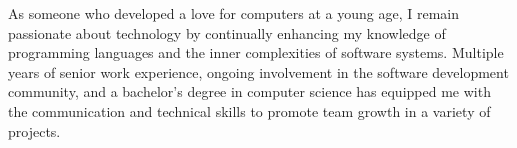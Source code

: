 

\begin{cvparagraph}

    As someone who developed a love for computers at a young age, I remain passionate about technology by
    continually enhancing my knowledge of programming languages and the inner complexities of software systems.
    Multiple years of senior work experience, ongoing involvement in the software development community, and a
    bachelor's degree in computer science has equipped me with the communication and technical skills to promote
    team growth in a variety of projects.
\end{cvparagraph}
